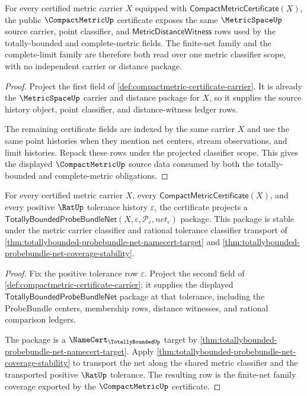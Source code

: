 \begin{theorem}
\label{thm:compactmetric-metric-source-scope}
For every certified metric carrier $X$ equipped with
$\mathsf{CompactMetricCertificate}(X)$, the public $\CompactMetricUp$
certificate exposes the same $\MetricSpaceUp$ source carrier, point
classifier, and $\mathsf{MetricDistanceWitness}$ rows used by the
totally-bounded and complete-metric fields. The finite-net family and the
complete-limit family are therefore both read over one metric classifier
scope, with no independent carrier or distance package.
\end{theorem}
\begin{proof}
Project the first field of
\autoref{def:compactmetric-certificate-carrier}. It is already the
$\MetricSpaceUp$ carrier and distance package for $X$, so it supplies the
source history object, point classifier, and distance-witness ledger rows.

The remaining certificate fields are indexed by the same carrier $X$ and use
the same point histories when they mention net centers, stream observations,
and limit histories. Repack these rows under the projected classifier scope.
This gives the displayed $\CompactMetricUp$ source data consumed by both the
totally-bounded and complete-metric obligations.
\end{proof}

\begin{theorem}
\label{thm:compactmetric-net-family-coverage}
For every certified metric carrier $X$, every
$\mathsf{CompactMetricCertificate}(X)$, and every positive $\RatUp$ tolerance
history $\varepsilon$, the certificate projects a
$\mathsf{TotallyBoundedProbeBundleNet}(X,\varepsilon,\mathcal{P}_{\varepsilon},net_{\varepsilon})$
package. This package is stable under the metric carrier classifier and
rational tolerance classifier transport of
\autoref{thm:totallybounded-probebundle-net-namecert-target} and
\autoref{thm:totallybounded-probebundle-net-coverage-stability}.
\end{theorem}
\begin{proof}
Fix the positive tolerance row $\varepsilon$. Project the second field of
\autoref{def:compactmetric-certificate-carrier}; it supplies the displayed
$\mathsf{TotallyBoundedProbeBundleNet}$ package at that tolerance, including
the ProbeBundle centers, membership rows, distance witnesses, and rational
comparison ledgers.

The package is a $\NameCert_{\TotallyBoundedUp}$ target by
\autoref{thm:totallybounded-probebundle-net-namecert-target}. Apply
\autoref{thm:totallybounded-probebundle-net-coverage-stability} to transport
the net along the shared metric classifier and the transported positive
$\RatUp$ tolerance. The resulting row is the finite-net family coverage
exported by the $\CompactMetricUp$ certificate.
\end{proof}

